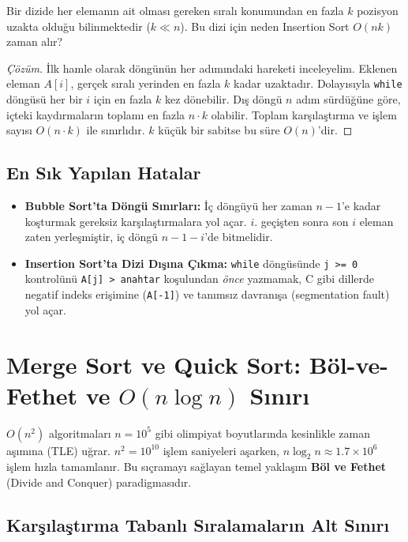 \begin{example}
Bir dizide her elemanın ait olması gereken sıralı konumundan en fazla $k$ pozisyon uzakta olduğu bilinmektedir ($k \ll n$). Bu dizi için neden Insertion Sort $O(nk)$ zaman alır?
\end{example}

\begin{proof}[Çözüm]
İlk hamle olarak döngünün her adımındaki hareketi inceleyelim. Eklenen eleman $A[i]$, gerçek sıralı yerinden en fazla $k$ kadar uzaktadır. Dolayısıyla \texttt{while} döngüsü her bir $i$ için en fazla $k$ kez dönebilir.
Dış döngü $n$ adım sürdüğüne göre, içteki kaydırmaların toplamı en fazla $n \cdot k$ olabilir. Toplam karşılaştırma ve işlem sayısı $O(n \cdot k)$ ile sınırlıdır. $k$ küçük bir sabitse bu süre $O(n)$'dir.
\end{proof}

\subsection{En Sık Yapılan Hatalar}
\begin{itemize}
    \item \textbf{Bubble Sort'ta Döngü Sınırları:} İç döngüyü her zaman $n-1$'e kadar koşturmak gereksiz karşılaştırmalara yol açar. $i$. geçişten sonra son $i$ eleman zaten yerleşmiştir, iç döngü $n - 1 - i$'de bitmelidir.
    \item \textbf{Insertion Sort'ta Dizi Dışına Çıkma:} \texttt{while} döngüsünde \texttt{j >= 0} kontrolünü \texttt{A[j] > anahtar} koşulundan \emph{önce} yazmamak, C gibi dillerde negatif indeks erişimine (\texttt{A[-1]}) ve tanımsız davranışa (segmentation fault) yol açar.
\end{itemize}

\section{Merge Sort ve Quick Sort: Böl-ve-Fethet ve $O(n \log n)$ Sınırı}

$O(n^2)$ algoritmaları $n = 10^5$ gibi olimpiyat boyutlarında kesinlikle zaman aşımına (TLE) uğrar. $n^2 = 10^{10}$ işlem saniyeleri aşarken, $n \log_2 n \approx 1.7 \times 10^6$ işlem hızla tamamlanır. Bu sıçramayı sağlayan temel yaklaşım \textbf{Böl ve Fethet} (Divide and Conquer) paradigmasıdır.

\subsection{Karşılaştırma Tabanlı Sıralamaların Alt Sınırı}

